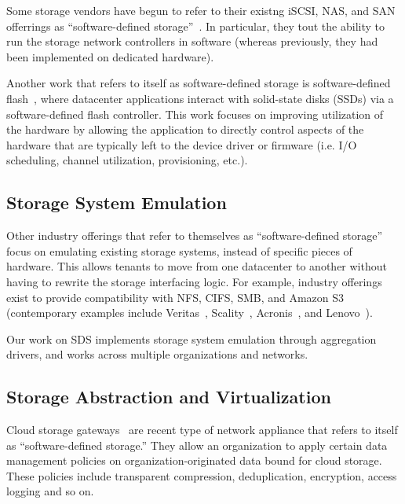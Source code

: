 Some storage vendors have begun to refer to their existng iSCSI, NAS, and SAN offerrings as
``software-defined storage''~\cite{computerweekly-storagebuzz}.  In particular,
they tout the ability to run the storage network controllers in
software (whereas previously, they had been implemented on dedicated hardware).

Another work that refers to itself as software-defined storage
is software-defined flash~\cite{sdf-baidu}, where
datacenter applications interact with solid-state disks (SSDs) via a
software-defined flash controller.  This work focuses on improving utilization
of the hardware by allowing the application to directly control aspects of the
hardware that are typically left to the device driver or firmware (i.e. I/O scheduling,
channel utilization, provisioning, etc.).

\subsection{Storage System Emulation}

Other industry offerings that refer to themselves as ``software-defined storage''
focus on emulating existing storage systems, instead of specific pieces of
hardware.  This allows tenants to move from one datacenter to another without having to
rewrite the storage interfacing logic.  For example, industry offerings exist to
provide compatibility with NFS, CIFS, SMB, and Amazon S3 (contemporary examples include
Veritas~\cite{veritas}, Scality~\cite{scality}, Acronis~\cite{acronis}, and
Lenovo~\cite{lenovo}).

Our work on SDS implements storage system emulation
through aggregation drivers, and works across multiple organizations and
networks.

\subsection{Storage Abstraction and Virtualization}


Cloud storage gateways~\cite{gartner-cloud-storage-gateway} are recent type of
network appliance that refers to itself as ``software-defined storage.''
They allow an organization to apply certain data management
policies on organization-originated data bound for cloud storage.  These
policies include transparent compression, deduplication, encryption, access
logging and so on.

